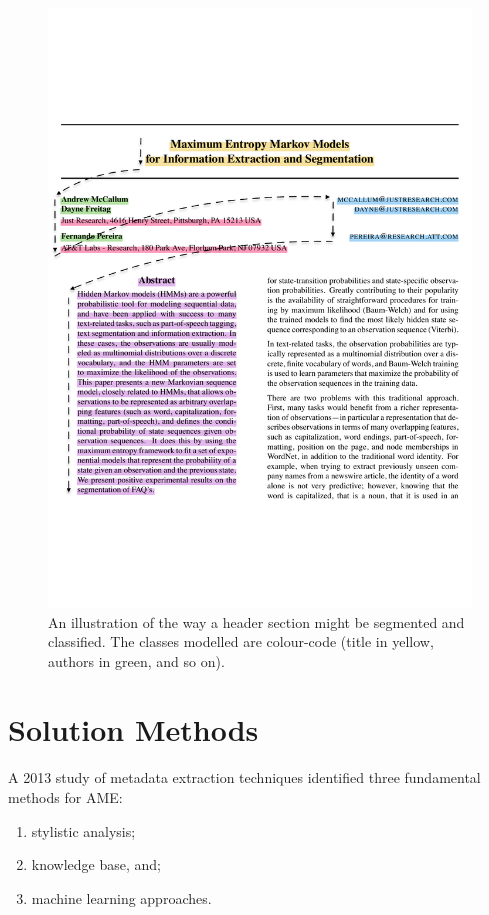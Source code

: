 \begin{figure}[!ht]
\center
\includegraphics[width=\textwidth]{Figures/extraction.pdf}
\caption{An illustration of the way a header section might be segmented and classified. The classes modelled are colour-code (title in yellow, authors in green, and so on).}
\label{fig:grobid}
\end{figure}

\section{Solution Methods}

A 2013 study of metadata extraction techniques \cite{lipinski2013evaluation} identified three fundamental methods for AME:

\begin{enumerate}
\item stylistic analysis;
\item knowledge base, and;
\item machine learning approaches.
\end{enumerate}

